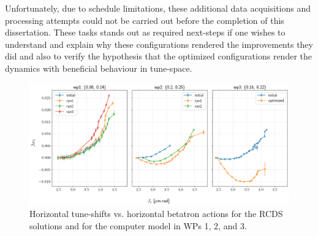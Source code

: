 Unfortunately, due to schedule limitations, these additional data acquisitions and processing attempts could not be carried out before the completion of this dissertation. These tasks stands out as required next-steps if one wishes to understand and explain why these configurations rendered the improvements they did and also to verify the hypothesis that the optimized configurations render the dynamics with beneficial behaviour in tune-space. 
\begin{figure}[tb]
    \includegraphics[width=\columnwidth]{Images/adts.png}
    \caption[Horizontal tune-shifts vs. horizontal betatron actions for the RCDS solutions and for the computer model in WPs 1, 2, and 3.]{Horizontal tune-shifts vs. horizontal betatron actions for the \gls*{RCDS} solutions and for the computer model in WPs 1, 2, and 3.}
    \label{fig:adts}
\end{figure}
